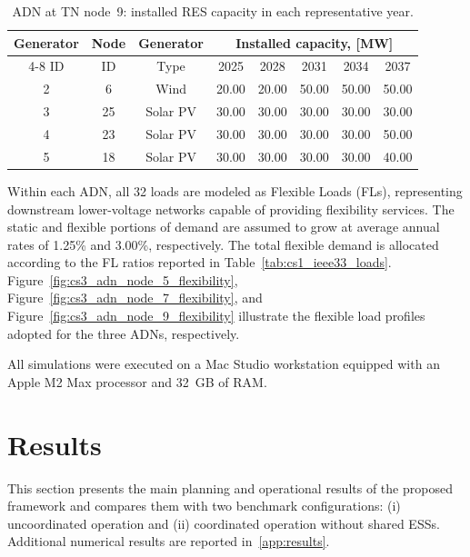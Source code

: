 \documentclass[preprint,12pt]{elsarticle}
\begin{document}
\begin{table}[htbp!]
    \centering
    \caption{ADN at TN node~9: installed RES capacity in each representative year.}
    \begin{tabular}{ccc ccccc}
        \toprule
        Generator   & Node  & Generator & \multicolumn{5}{c}{Installed capacity, [MW]}\\  \cmidrule{4-8}
        ID          & ID    & Type      & 2025  & 2028  & 2031  & 2034   & 2037 \\ 
        \midrule
        2 & 6  & Wind     & 20.00 & 20.00 & 50.00 & 50.00 & 50.00\\
        3 & 25 & Solar PV & 30.00 & 30.00 & 30.00 & 30.00 & 30.00\\
        4 & 23 & Solar PV & 30.00 & 30.00 & 30.00 & 30.00 & 50.00\\
        5 & 18 & Solar PV & 30.00 & 30.00 & 30.00 & 30.00 & 40.00\\
        \bottomrule
    \end{tabular}
    \label{tab:cs3_adn_node_9_res_generators}
\end{table}

Within each ADN, all 32 loads are modeled as Flexible Loads (FLs), representing downstream lower-voltage networks capable of providing flexibility services. The static and flexible portions of demand are assumed to grow at average annual rates of 1.25\% and 3.00\%, respectively. The total flexible demand is allocated according to the FL ratios reported in Table~\ref{tab:cs1_ieee33_loads}. Figure~\ref{fig:cs3_adn_node_5_flexibility}, Figure~\ref{fig:cs3_adn_node_7_flexibility}, and Figure~\ref{fig:cs3_adn_node_9_flexibility} illustrate the flexible load profiles adopted for the three ADNs, respectively.

All simulations were executed on a Mac Studio workstation equipped with an Apple M2 Max processor and 32~GB of RAM.

\section{Results}
\label{sec:results}

This section presents the main planning and operational results of the proposed framework and compares them with two benchmark configurations: (i) uncoordinated operation and (ii) coordinated operation without shared ESSs. Additional numerical results are reported in~\ref{app:results}.
\end{document}
